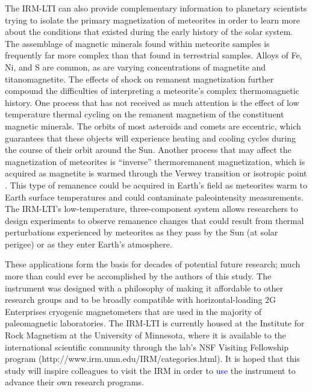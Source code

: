 \documentclass[draft,gc]{AGUTeX}
\begin{document}
\begin{article}
The IRM-LTI can also provide complementary information to planetary scientists trying to isolate the primary magnetization of meteorites in order to learn more about the conditions that existed during the early history of the solar system. The assemblage of magnetic minerals found within meteorite samples is frequently far more complex than that found in terrestrial samples. Alloys of Fe, Ni, and S are common, as are varying concentrations of magnetite and titanomagnetite. The effects of shock on remanent magnetization further compound the difficulties of interpreting a meteorite’s complex thermomagnetic history. One process that has not received as much attention is the effect of low temperature thermal cycling on the remanent magnetism of the constituent magnetic minerals. The orbits of most asteroids and comets are eccentric, which guarantees that these objects will experience heating and cooling cycles during the course of their orbit around the Sun. Another process that may affect the magnetization of meteorites is “inverse” thermoremanent magnetization, which is acquired as magnetite is warmed through the Verwey transition or isotropic point \citep{Dunlop2006a}. This type of remanence could be acquired in Earth's field as meteorites warm to Earth surface temperatures and could contaminate paleointensity measurements. The IRM-LTI's low-temperature, three-component system allows researchers to design experiments to observe remanence changes that could result from thermal perturbations experienced by meteorites as they pass by the Sun (at solar perigee) or as they enter Earth's atmosphere.

These applications form the basis for decades of potential future research; much more than could ever be accomplished by the authors of this study. The instrument was designed with a philosophy of making it affordable to other research groups and to be broadly compatible with horizontal-loading 2G Enterprises cryogenic magnetometers that are used in the majority of paleomagnetic laboratories. The IRM-LTI is currently housed at the Institute for Rock Magnetism at the University of Minnesota, where it is available to the international scientific community through the lab's NSF Visiting Fellowship program (http://www.irm.umn.edu/IRM/categories.html). It is hoped that this study will inspire colleagues to visit the IRM in order to \textcolor{blue}{use} the instrument to advance their own research programs.    



\end{article}
\end{document}
